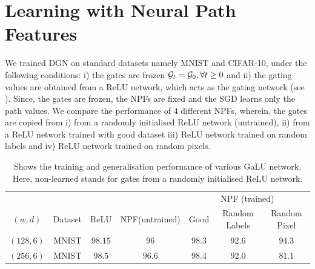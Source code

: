 \section{Learning with Neural Path Features}

 We trained DGN on standard datasets namely MNIST and CIFAR-10, under the following conditions: i) the gates are frozen $\mathcal{G}_t=\mathcal{G}_0,\forall t\geq 0$ and ii) the gating values are obtained from a ReLU network, which acts as the gating network (see ). Since, the gates are frozen, the NPFs are fixed and the SGD learns only the path values. We compare the performance of $4$ different NPFs, wherein, the gates are copied from i) from a randomly initialised ReLU network (untrained), ii) from a ReLU network trained with good dataset iii) ReLU network trained on random labels and iv) ReLU network trained on random pixels.
\FloatBarrier
\begin{table}[h]
\begin{tabular}{|c|c|c|c|c|c|c|}\hline
&&&&\multicolumn{3}{c|}{NPF (trained)}\\\cline{5-7}
$(w,d)$	&Dataset		&ReLU		&NPF(untrained) 		&Good 		&Random Labels 	&Random Pixel\\\hline
$(128,6)$	& MNIST 		& $98.15$ 		&$96$ 		&$98.3$		&$92.6$			&$94.3$\\\hline
$(256,6)$	& MNIST 		& $98.5$ 		&$96.6$ 		&$98.4$		&$92.0$			&$81.1$\\\hline
\end{tabular}
\caption{Shows the training and generalisation performance of various GaLU network. Here, non-learned stands for gates from a randomly initialised ReLU network.}
\label{tb:npfs}
\end{table}
\FloatBarrier
